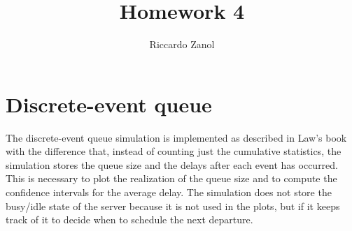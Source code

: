 \documentclass[a4paper,oneside]{article}
\author{Riccardo Zanol}
\title{Homework 4}
\begin{document}
\maketitle
\section{Discrete-event queue}

The discrete-event queue simulation is implemented as described in
Law's book with the difference that, instead of counting just the
cumulative statistics, the simulation stores the queue size and the
delays after each event has occurred. This is necessary to plot the
realization of the queue size and to compute the confidence intervals
for the average delay. The simulation does not store the busy/idle
state of the server because it is not used in the plots, but if it
keeps track of it to decide when to schedule the next departure.
\end{document}
